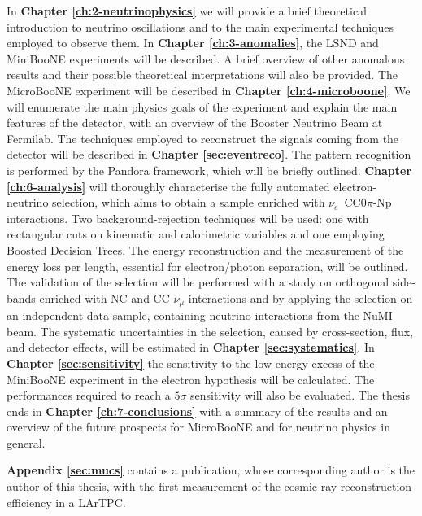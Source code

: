 In \textbf{Chapter \ref{ch:2-neutrinophysics}} we will provide a brief theoretical introduction to neutrino oscillations and to the main experimental techniques employed to observe them.
In \textbf{Chapter \ref{ch:3-anomalies}}, the LSND and MiniBooNE experiments will be described. A brief overview of other anomalous results and their possible theoretical interpretations will also be provided.
The MicroBooNE experiment will be described in \textbf{Chapter \ref{ch:4-microboone}}. We will enumerate the main physics goals of the experiment and explain the main features of the detector, with an overview of the Booster Neutrino Beam at Fermilab.
The techniques employed to reconstruct the signals coming from the detector will be described in \textbf{Chapter \ref{sec:eventreco}}. The pattern recognition is performed by the Pandora framework, which will be briefly outlined.
\textbf{Chapter \ref{ch:6-analysis}} will thoroughly characterise the fully automated electron-neutrino selection, which aims to obtain a sample enriched with $\nu_e$~CC0$\pi$-Np interactions. Two background-rejection techniques will be used: one with rectangular cuts on kinematic and calorimetric variables and one employing Boosted Decision Trees. The energy reconstruction and the measurement of the energy loss per length, essential for electron/photon separation, will be outlined. The validation of the selection will be performed with a study on orthogonal side-bands enriched with NC and CC $\nu_{\mu}$ interactions and by applying the selection on an independent data sample, containing neutrino interactions from the NuMI beam. The systematic uncertainties in the selection, caused by cross-section, flux, and detector effects, will be estimated in \textbf{Chapter \ref{sec:systematics}}.
In \textbf{Chapter \ref{sec:sensitivity}} the sensitivity to the low-energy excess of the MiniBooNE experiment in the electron hypothesis will be calculated. The performances required to reach a $5\sigma$ sensitivity will also be evaluated.
The thesis ends in \textbf{Chapter \ref{ch:7-conclusions}} with a summary of the results and an overview of the future prospects for MicroBooNE and for neutrino physics in general. 

\vspace{1em}

\textbf{Appendix \ref{sec:mucs}} contains a publication, whose corresponding author is the author of this thesis, with the first measurement of the cosmic-ray reconstruction efficiency in a LArTPC.
